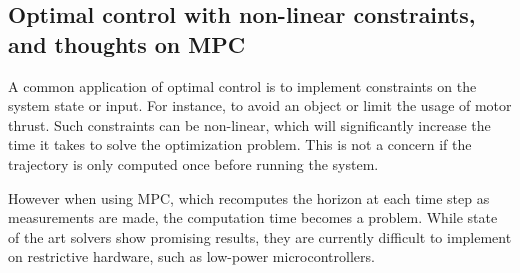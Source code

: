 \subsection{Optimal control with non-linear constraints, and thoughts on MPC}
A common application of optimal control is to implement constraints on the system state or input.
For instance, to avoid an object or limit the usage of motor thrust. Such constraints can be non-linear, which will significantly increase the time it takes to solve the optimization problem.
This is not a concern if the trajectory is only computed once before running the system.

However when using MPC, which recomputes the horizon at each time step as measurements are made, the computation time becomes a problem. While state of the art solvers show promising results, they
are currently difficult to implement on restrictive hardware, such as low-power microcontrollers.
